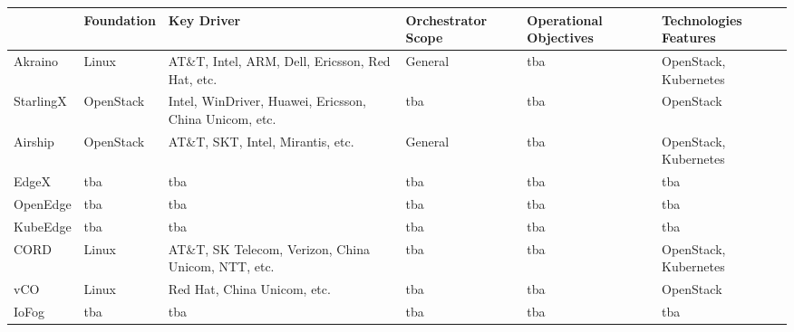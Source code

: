 \begin{turn}{90}
    \begin{tabular}{ | l | l | p{5cm} | l | l | l |}
    \hline
      & Foundation & Key Driver & Orchestrator Scope & Operational Objectives & Technologies Features\\ \hline
    Akraino & Linux & AT\&T, Intel, ARM, Dell, Ericsson, Red Hat, etc. & General & tba & OpenStack, Kubernetes \\ \hline

    StarlingX & OpenStack & Intel, WinDriver, Huawei,
    Ericsson, China Unicom, etc. & tba & tba & OpenStack \\ \hline

    Airship & OpenStack &  AT\&T, SKT,
    Intel, Mirantis, etc. & General & tba & OpenStack, Kubernetes \\ \hline

    EdgeX & tba & tba & tba & tba & tba \\ \hline

    OpenEdge & tba & tba & tba & tba & tba \\ \hline

    KubeEdge & tba & tba & tba & tba & tba \\ \hline

    CORD & Linux & AT\&T, SK Telecom,
    Verizon, China Unicom, NTT, etc. & tba & tba & OpenStack, Kubernetes \\ \hline

    vCO & Linux & Red Hat, China Unicom, etc. & tba & tba & OpenStack \\ \hline

    IoFog & tba & tba & tba & tba & tba \\ \hline
    
    \end{tabular}
\end{turn}
